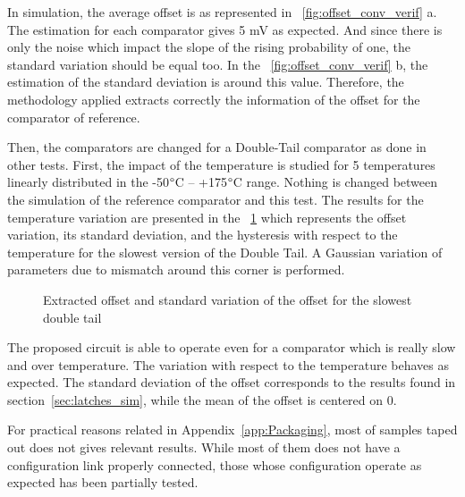 In simulation, the average offset is as represented in \figurename~\ref{fig:offset_conv_verif} a. The estimation for each comparator gives 5 mV as expected. And since there is only the noise which impact the slope of the rising probability of one, the standard variation should be equal too. In the \figurename~\ref{fig:offset_conv_verif} b, the estimation of the standard deviation is around this value. Therefore, the methodology applied extracts correctly the information of the offset for the comparator of reference.

Then, the comparators are changed for a Double-Tail comparator as done in other tests. First, the impact of the temperature is studied for 5 temperatures linearly distributed in the -50$\degree$C -- +175$\degree$C range. Nothing is changed between the simulation of the reference comparator and this test.
The results for the temperature variation are presented in the \figurename~\ref{fig:offset_conv_dtl} which represents the offset variation, its standard deviation, and the hysteresis with respect to the temperature for the slowest version of the Double Tail. A Gaussian variation of parameters due to mismatch around this corner is performed.

\begin{figure}[htp]
    \centering
    \begin{subfigure}[b]{0.32\textwidth}
    \end{subfigure}
    \begin{subfigure}[b]{0.32\textwidth}
    \end{subfigure}
    \begin{subfigure}[b]{0.32\textwidth}
    \end{subfigure}
    \caption{Extracted offset and standard variation of the offset for the slowest double tail}
    \label{fig:offset_conv_dtl}
\end{figure}

The proposed circuit is able to operate even for a comparator which is really slow and over temperature. The variation with respect to the temperature behaves as expected. The standard deviation of the offset corresponds to the results found in section~\ref{sec:latches_sim}, while the mean of the offset is centered on 0.

For practical reasons related in Appendix~\ref{app:Packaging}, most of samples taped out does not gives relevant results. While most of them does not have a configuration link properly connected, those whose configuration operate as expected has been partially tested. 
